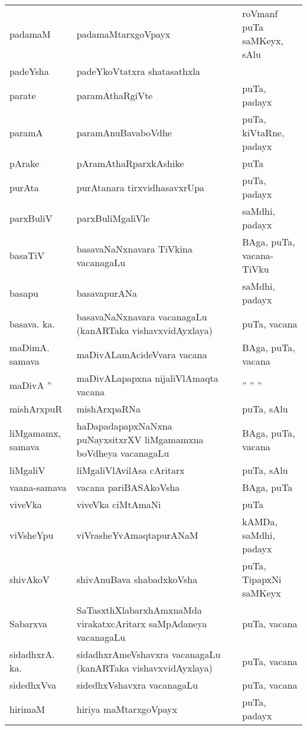 {\begin{longtable}{lll}
padamaM & padamaMtarxgoVpayx & roVmanf puTa saMKeyx, sAlu\\
padeYsha & padeYkoVtatxra shatasathxla & \\
parate & paramAthaRgiVte & puTa, padayx\\
paramA & paramAnuBavaboVdhe & puTa, kiVtaRne, padayx\\
pArake & pAramAthaRparxkAshike & puTa\\
purAta & purAtanara tirxvidhasavxrUpa & puTa, padayx\\
parxBuliV & parxBuliMgaliVle & saMdhi, padayx\\
basaTiV & basavaNaNxnavara TiVkina vacanagaLu & BAga, puTa, vacana-TiVku\\
basapu & basavapurANa & saMdhi, padayx\\
basava. ka. & basavaNaNxnavara vacanagaLu (kanARTaka vishavxvidAyxlaya) & puTa, vacana\\
maDimA. samava & maDivALamAcideVvara vacana & BAga, puTa, vacana\\
maDivA '' & maDivALapapxna nijaliVlAmaqta vacana & \qquad '' '' ''\\
mishArxpuR & mishArxpaRNa & puTa, sAlu\\
liMgamamx, samava & haDapadapapxNaNxna puNayxsitxrXV liMgamamxna boVdheya vacanagaLu & BAga, puTa, vacana\\
liMgaliV & liMgaliVlAvilAsa cAritarx & puTa, sAlu\\
vaana-samava & vacana pariBASAkoVsha & BAga, puTa\\
viveVka & viveVka ciMtAmaNi & puTa\\
viVsheYpu & viVrasheYvAmaqtapurANaM & kAMDa, saMdhi, padayx\\
shivAkoV & shivAnuBava shabadxkoVsha & puTa, TipapxNi saMKeyx\\
Sabarxva & SaTasxthXlabarxhAmxnaMda virakatxcAritarx saMpAdaneya vacanagaLu & puTa, vacana\\
sidadhxrA. ka. & sidadhxrAmeVshavxra vacanagaLu (kanARTaka vishavxvidAyxlaya) & puTa, vacana\\
sidedhxVva & sidedhxVshavxra vacanagaLu & puTa, vacana\\
hirimaM & hiriya maMtarxgoVpayx & puTa, padayx\\
\hline
\end{longtable}}


\newpage

